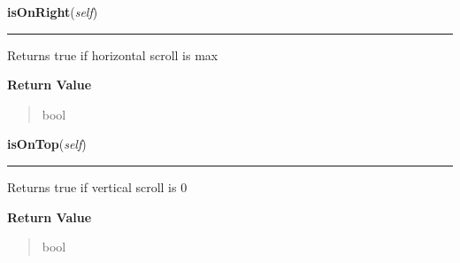     \label{ImagePanel:ImagePanel:isOnRight}

    \vspace{0.5ex}

\hspace{.8\funcindent}\begin{boxedminipage}{\funcwidth}

    \raggedright \textbf{isOnRight}(\textit{self})

    \vspace{-1.5ex}

    \rule{\textwidth}{0.5\fboxrule}
\setlength{\parskip}{2ex}
    Returns true if horizontal scroll is max

\setlength{\parskip}{1ex}
      \textbf{Return Value}
    \vspace{-1ex}

      \begin{quote}
      bool

      \end{quote}

    \end{boxedminipage}

    \label{ImagePanel:ImagePanel:isOnTop}

    \vspace{0.5ex}

\hspace{.8\funcindent}\begin{boxedminipage}{\funcwidth}

    \raggedright \textbf{isOnTop}(\textit{self})

    \vspace{-1.5ex}

    \rule{\textwidth}{0.5\fboxrule}
\setlength{\parskip}{2ex}
    Returns true if vertical scroll is 0

\setlength{\parskip}{1ex}
      \textbf{Return Value}
    \vspace{-1ex}

      \begin{quote}
      bool

      \end{quote}

    \end{boxedminipage}

    \label{ImagePanel:ImagePanel:isOnBottom}

